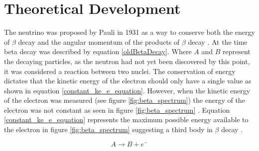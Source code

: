 \section{Theoretical Development}
The neutrino was proposed by Pauli in 1931 as a way to conserve both the energy of $\beta$ decay and the angular momentum of the products of $\beta$ decay  \cite{griffiths2008book}\cite{griffiths2008neutrino1.5}\cite{lederman1970resource}. At the time beta decay was described by equation \ref{oldBetaDecay}. Where $A$ and $B$ represent the decaying particles, as the neutron had not yet been discovered by this point, it was considered a reaction between two nuclei. The conservation of energy dictates that the kinetic energy of the electron should only have a single value as shown in equation \ref{constant_ke_e_equation}. However, when the kinetic energy of the electron was measured (see figure \ref{fig:beta_spectrum}) the energy of the electron was not constant as seen in figure \ref{fig:beta_spectrum} \cite{griffiths2008book} \cite{griffiths2008neutrino1.5} \cite{lewis1970neutrinos}. Equation \ref{constant_ke_e_equation} represents the maximum possible energy available to the electron in figure \ref{fig:beta_spectrum} suggesting a third body in $\beta$ decay \cite{griffiths2008book} \cite{griffiths2008neutrino1.5}.


\begin{equation}
    A \rightarrow B + e^-
    \label{oldBetaDecay}
\end{equation}

